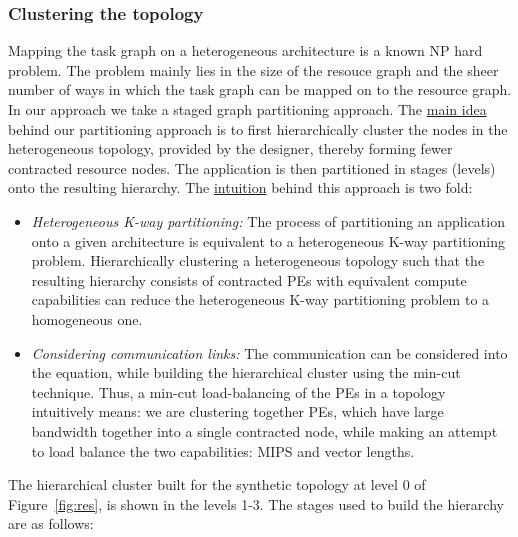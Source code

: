 \subsubsection{Clustering the topology}
\label{sec:clustering-topology}

Mapping the task graph on a heterogeneous architecture is a known NP
hard problem. The problem mainly lies in the size of the resouce graph
and the sheer number of ways in which the task graph can be mapped on to
the resource graph. In our approach we take a staged graph partitioning
approach. The \underline{main idea} behind our partitioning approach is
to first hierarchically cluster the nodes in the heterogeneous topology,
provided by the designer, thereby forming fewer contracted resource
nodes. The application is then partitioned in stages (levels) onto the
resulting hierarchy. The \underline{intuition} behind this approach is
two fold:

\begin{itemize}

\item \textit{Heterogeneous K-way partitioning:} The process of
  partitioning an application onto a given architecture is equivalent to
  a heterogeneous K-way partitioning problem. Hierarchically clustering
  a heterogeneous topology such that the resulting hierarchy consists of
  contracted PEs with equivalent compute capabilities can reduce the
  heterogeneous K-way partitioning problem to a homogeneous one.

\item \textit{Considering communication links:} The communication can be
  considered into the equation, while building the hierarchical cluster
  using the min-cut technique. Thus, a min-cut load-balancing of the PEs
  in a topology intuitively means: we are clustering together PEs, which
  have large bandwidth together into a single contracted node, while
  making an attempt to load balance the two capabilities: MIPS and
  vector lengths.

\end{itemize}

The hierarchical cluster built for the synthetic topology at level 0 of
Figure~\ref{fig:res}, is shown in the levels 1-3. The stages used to
build the hierarchy are as follows:

